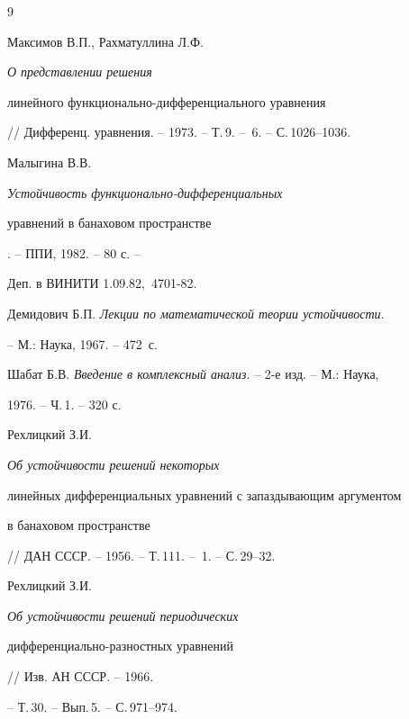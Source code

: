  


 


\begin{thebibliography}{9} 


 




Максимов В.П., Рахматуллина Л.Ф. {\em О представлении решения 


линейного функционально-дифференциального уравнения} 


// Дифференц. уравнения. -- 1973. -- Т.\,9. -- \No\,6. -- С.\,1026--1036. 




Малыгина В.В. {\em Устойчивость функционально-дифференциальных 


уравнений в банаховом пространстве}. -- ППИ, 1982. -- 80 с. -- 


Деп. в ВИНИТИ 1.09.82, \No\,4701-82. 




Демидович Б.П. {\em Лекции по математической теории устойчивости}. 


-- М.: Наука, 1967. -- 472~с. 




Шабат Б.В. {\em Введение в комплексный анализ}. -- 2-е изд. -- М.: Наука, 


1976. -- Ч.\,1. -- 320 с. 




Рехлицкий З.И. {\em Об устойчивости решений некоторых 


линейных дифференциальных уравнений с запаздывающим аргументом 


в банаховом пространстве} 


// ДАН СССР. -- 1956. -- Т.\,111. -- \No\,1. -- С.\,29--32. 




Рехлицкий З.И. {\em Об устойчивости решений периодических 


дифференциально-разностных уравнений} // Изв. АН СССР. -- 1966. 


-- Т.\,30. -- Вып.\,5. -- С.\,971--974. 


 


\end{thebibliography} 


 


\vskip 2cm 


 






 


\label{end} 


 





